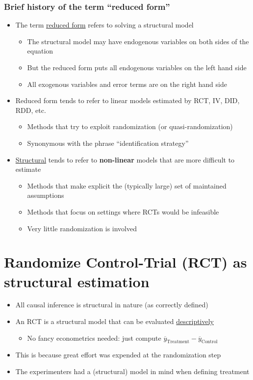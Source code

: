 \documentclass[11pt]{article}
\begin{document}
\subsubsection{Brief history of the term ``reduced form''}
\label{sec:org9cfa240}

\begin{itemize}
\item The term \uline{reduced form} refers to solving a structural model
\begin{itemize}
\item The structural model may have endogenous variables on both sides of the equation
\item But the reduced form puts all endogenous variables on the left hand side
\item All exogenous variables and error terms are on the right hand side
\end{itemize}
\item Reduced form tends to refer to linear models estimated by RCT, IV, DID, RDD, etc.
\begin{itemize}
\item Methods that try to exploit randomization (or quasi-randomization)
\item Synonymous with the phrase ``identification strategy''
\end{itemize}
\item \uline{Structural} tends to refer to \textbf{non-linear} models that are more difficult to estimate
\begin{itemize}
\item Methods that make explicit the (typically large) set of maintained assumptions
\item Methods that focus on settings where RCTs would be infeasible
\item Very little randomization is involved
\end{itemize}
\end{itemize}

\section{Randomize Control-Trial (RCT) as structural estimation}
\label{sec:org3317d19}

\begin{itemize}
\item All causal inference is structural in nature (as correctly defined)
\item An RCT is a structural model that can be evaluated \uline{descriptively} 
\begin{itemize}
\item No fancy econometrics needed: just compute \(\overline{y}_{\text{Treatment}} - \overline{y}_{\text{Control}}\)
\end{itemize}
\item This is because great effort was expended at the randomization step
\item The experimenters had a (structural) model in mind when defining treatment
\end{itemize}
\end{document}
